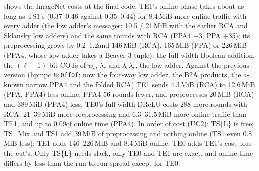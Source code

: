  shows the ImageNet costs at the final code. TE1's online phase takes about as long as TS1's (0.37--0.46
against 0.35--0.44\s) for 8.4\,MiB more online traffic with every adder (the low adder's messages; 10.5 / 21\,MiB with
the earlier RCA and Sklansky low adders) and the same rounds with RCA (PPA4 +3, PPA +35); its preprocessing grows by
0.2--1.2\s and 146\,MiB (RCA), 165\,MiB (PPA) or 226\,MiB (PPA4, whose low adder takes a Beaver 3-tuple): the
full-width Boolean addition, the $(\ell - 1)$-bit COTs of $w_t$, $\lambda_c$ and $\lambda_b \lambda_c$, the low adder.
Against the previous version (hpmpc \texttt{8c0ff0f}; now the four-way low adder, the B2A products, the a-known
narrow PPA4 and the folded RCA) TE1 sends 4.3\,MiB (RCA) to 12.6\,MiB (PPA, PPA4) less online, PPA4 56 rounds fewer,
and preprocesses 20\,MiB (RCA) and 389\,MiB (PPA4) less. TE0's full-width DReLU costs 288 more rounds with RCA,
21--39\,MiB more preprocessing and 6.3--31.5\,MiB more online traffic than TE1, and up to 0.09\s of online time (PPA4).
In order of cost (UC2): TS\{L\} is free; TS\_Mix and TS1 add 39\,MiB of preprocessing and nothing online (TS1 even
0.8\,MiB less); TE1 adds 146--226\,MiB and 8.4\,MiB online; TE0 adds TE1's cost plus the cut's. Only TS\{L\} needs
slack, only TE0 and TE1 are exact, and online time differs by less than the run-to-run spread except for TE0.

